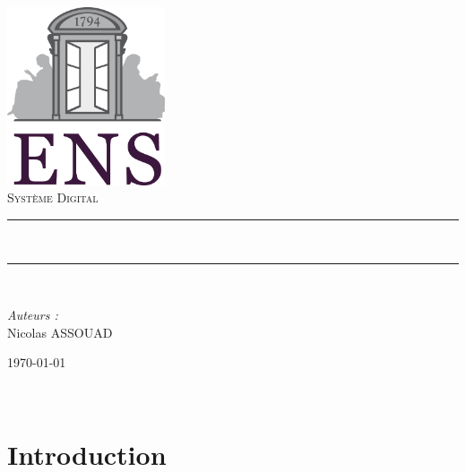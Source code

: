 \documentclass[a4paper, 12pt, twoside]{report}
\newcommand{\HRule}{\rule{\linewidth}{0.5mm}}
\begin{document}

\begin{titlepage}
\begin{center}

\includegraphics[width=0.35\textwidth]{./ENS_Logo.png}~\\[1cm]

\textsc{\Large Système Digital}\\[0.5cm]

\HRule \\[0.4cm{ \huge \bfseries Microprocesseur \\[0.4cm] }
\large{\textit{Implémentation d'une horloge digitale}}]

\HRule \\[1.5cm]
\end{center}

\begin{minipage}{0.4\textwidth}
\begin{flushleft} \large
\emph{Auteurs :}\\
Nicolas ASSOUAD\\
\end{flushleft}
\end{minipage}

\begin{center}
\vfill
{\large \today}

\end{center}
\end{titlepage}

\newpage\strut
\tableofcontents
\thispagestyle{fancyplain}

\newpage~
\newpage~

\section*{Introduction}
\end{document}
